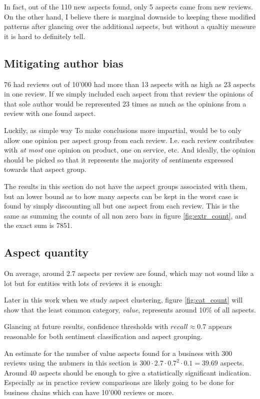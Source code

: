 \documentclass[a4paper,11pt]{kth-mag}
\begin{document}
In fact, out of the 110 new aspects found, only 5 aspects came from new reviews.
On the other hand, I believe there is marginal downside to keeping these modified
patterns after glancing over the additional aspects, but without a qualtiy measure
it is hard to definitely tell. 

\subsection{Mitigating author bias}
76 had reviews out of 10'000 had more than 13 aspects with as high as 23 aspects
in one review. If we simply included each aspect from that review the opinions of
that sole author would be represented 23 times as much as the opinions from a review
with one found aspect.

Luckily, as simple way To make conclusions more impartial,
would be to only allow one opinion per aspect group from each review.
I.e. each review contributes with \emph{at most} one opinion on product, one on service, etc.
And ideally, the opinion should be picked so that it represents the majority of
sentiments expressed towards that aspect group.

The results in this section do not have the aspect groups associated with them,
but an lower bound as to how many aspects can be kept in the worst case
is found by simply discounting all but one aspect from each review. This is the same
as summing the counts of all non zero bars in figure \ref{fig:extr_count}, and the
exact sum is 7851.

\subsection{Aspect quantity}
On average, around 2.7 aspects per review are found, which may not sound like a lot 
but for entities with lots of reviews it is enough:

Later in this work when we study aspect clustering, figure \ref{fig:cat_count}
will show that the least common category, \emph{value}, represents around
10\% of all aspects.

Glancing at future results, confidence thresholds with $recall\approx 0.7$
appears reasonable for both sentiment classification and aspect grouping.

An estimate for the number of value aspects found for a business with 300 reviews
using the nubmers in this section is $300 \cdot 2.7 \cdot 0.7^2 \cdot 0.1 = 39.69$ aspects.
Around 40 aspects should be enough to give a statistically significant indication.
Especially as in practice review comparisons are likely going to be done for
business chains which can have 10'000 reviews or more.
\end{document}
